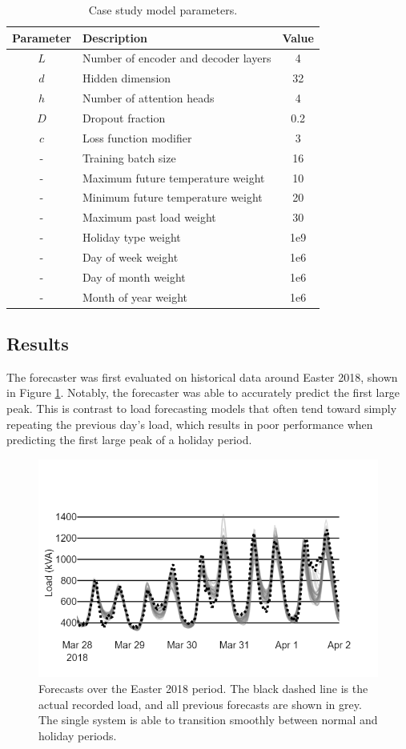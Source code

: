 \documentclass[conference]{IEEEtran}
\begin{document}
\begin{table}[htbp]
	\caption{Case study model parameters.}
	\begin{center}
		\begin{tabular}{clc}
			\textbf{Parameter}&\textbf{Description}&\textbf{Value} \\
			\hline
			$L$ & Number of encoder and decoder layers & 4 \\
			$d$ & Hidden dimension & 32 \\
			$h$ & Number of attention heads & 4 \\
			$D$ & Dropout fraction & 0.2 \\
			$c$ & Loss function modifier & 3 \\
			-   & Training batch size & 16 \\
			\hline
			-   & Maximum future temperature weight & 10 \\
			-   & Minimum future temperature weight & 20 \\
			-   & Maximum past load weight & 30 \\
			-   & Holiday type weight & 1e9 \\
			-   & Day of week weight & 1e6 \\
			-   & Day of month weight & 1e6 \\
			-   & Month of year weight & 1e6 \\
			
		\end{tabular}
		\label{table:parameters}
	\end{center}
\end{table}

\subsection{Results}

The forecaster was first evaluated on historical data around Easter 2018, shown in Figure \ref{fig:easter_forecasts}.
Notably, the forecaster was able to accurately predict the first large peak.
This is contrast to load forecasting models that often tend toward simply repeating the previous day's load, which results in poor performance when predicting the first large peak of a holiday period.


\begin{figure}[htbp]
	\centerline{\includegraphics[width=.40\textwidth]{images/easter_2018_all_forecast.png}}
	\caption{Forecasts over the Easter 2018 period.
			 The black dashed line is the actual recorded load, and all previous forecasts are shown in grey.
			 The single system is able to transition smoothly between normal and holiday periods.}
	\label{fig:easter_forecasts}
\end{figure}
\end{document}
